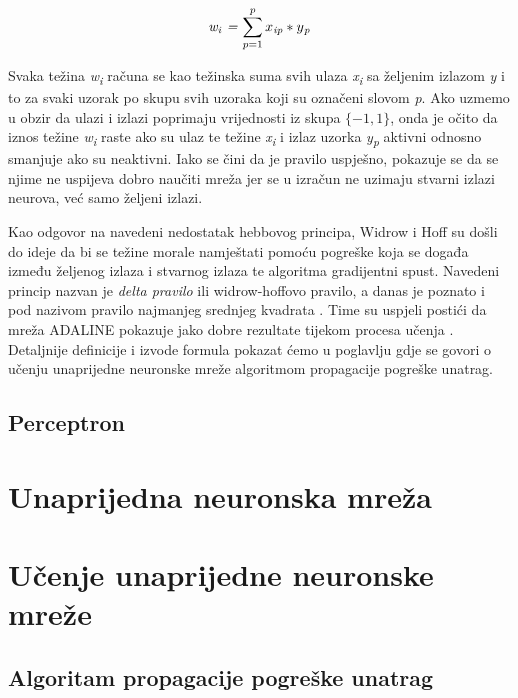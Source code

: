 \documentclass[times, utf8, zavrsni]{fer}
\begin{document}
\begin{equation}
    \textit{w\textsubscript{i} = $\sum\limits_{p = 1}^p x\textsubscript{ip} * y\textsubscript{p}$}
\end{equation}

Svaka težina \textit{w\textsubscript{i}} računa se kao težinska suma svih ulaza \textit{x\textsubscript{i}} sa željenim izlazom \textit{y} i to za svaki uzorak po skupu svih uzoraka koji su označeni slovom \textit{p}. Ako uzmemo u obzir da ulazi i izlazi poprimaju vrijednosti iz skupa $\{-1, 1\}$, onda je očito da iznos težine \textit{w\textsubscript{i}} raste ako su ulaz te težine \textit{x\textsubscript{i}} i izlaz uzorka \textit{y\textsubscript{p}} aktivni odnosno smanjuje ako su neaktivni. Iako se čini da je pravilo uspješno, pokazuje se da se njime ne uspijeva dobro naučiti mreža jer se u izračun ne uzimaju stvarni izlazi neurova, već samo željeni izlazi.

Kao odgovor na navedeni nedostatak hebbovog principa, Widrow i Hoff su došli do ideje da bi se težine morale namještati pomoću pogreške  koja se događa između željenog izlaza i stvarnog izlaza te algoritma gradijentni spust. Navedeni princip nazvan je \textit{delta pravilo}  ili widrow-hoffovo pravilo, a danas je poznato i pod nazivom pravilo najmanjeg srednjeg kvadrata . Time su uspjeli postići da mreža ADALINE pokazuje jako dobre rezultate tijekom procesa učenja \citep{picton2000}. Detaljnije definicije i izvode formula pokazat ćemo u poglavlju gdje se govori o učenju unaprijedne neuronske mreže algoritmom propagacije pogreške unatrag.

\subsection{Perceptron}

\section{Unaprijedna neuronska mreža}

\section{Učenje unaprijedne neuronske mreže}

\subsection{Algoritam propagacije pogreške unatrag}
\end{document}
